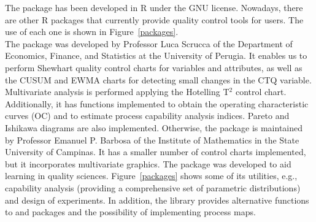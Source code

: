 The  package has been developed in R \citep{R} under the GNU license.
Nowadays, there are other R packages that currently provide quality control tools for users. The use of each one is shown in Figure~\ref{packages}.\\ 

The  package \citep{scrucca2004qcc} was developed by Professor Luca Scrucca of the Department of Economics, Finance, and Statistics at the University of Perugia. It enables us to perform Shewhart quality control charts for variables and attributes, as well as the CUSUM and EWMA charts for detecting small changes in the CTQ variable. Multivariate analysis is performed applying the Hotelling T$^2$ control chart. Additionally, it has functions implemented to obtain the operating characteristic curves (OC) and to estimate process capability analysis indices. Pareto and Ishikawa diagrams are also implemented. Otherwise, the  package \citep{recchia2010iqcc} is maintained by Professor Emanuel P. Barbosa of the Institute of Mathematics in the State University of Campinas. It has a smaller number of control charts implemented, but it incorporates multivariate graphics. The  package \citep{roth2012qualitytools} was developed to aid learning in quality sciences. Figure~\ref{packages} shows some of its utilities, e.g., capability analysis (providing a comprehensive set of parametric distributions) and design of experiments. In addition, the   library \citep{cano2017sixsigma,cano2017sixsigma2} provides alternative functions to  and  packages and the possibility of implementing process maps. \\

